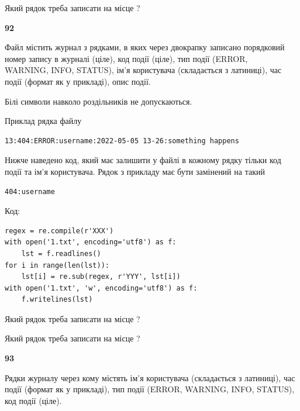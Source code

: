 Який рядок треба записати на місце  ?\par


\newpage

{\begin {center}\textbf{ 92}\end {center}}\par
Файл  містить журнал з рядками, в яких через двокрапку записано поряд\-ко\-вий номер запису в журналі (ціле), код події (ціле), тип події (ERROR, \\WARNING, INFO, STATUS), ім'я користувача (складається з латиниці), час події (фор\-мат як у прикладі), опис події.

Білі символи навколо роздільників не допускаються.

Приклад рядка файлу



\begin{verbatim}
13:404:ERROR:username:2022-05-05 13-26:something happens
\end{verbatim}


Нижче наведено код, який має залишити у файлі в кожному рядку тільки код події та ім'я користувача. Рядок з прикладу має бути замінений на такий



\begin{verbatim}
404:username
\end{verbatim}




Код:



\begin{verbatim}
regex = re.compile(r'XXX')
with open('1.txt', encoding='utf8') as f:
    lst = f.readlines()
for i in range(len(lst)):
    lst[i] = re.sub(regex, r'YYY', lst[i])
with open('1.txt', 'w', encoding='utf8') as f:
    f.writelines(lst)
\end{verbatim}







Який рядок треба записати на місце  ?\par
\vspace{5mm}


Який рядок треба записати на місце  ?\par


\newpage

{\begin {center}\textbf{ 93}\end {center}}\par
Рядки журналу через кому містять ім'я користувача (складається з латиниці), час події (фор\-мат як у прикладі), тип події (ERROR, WARNING, INFO, STATUS), код події (ціле).

